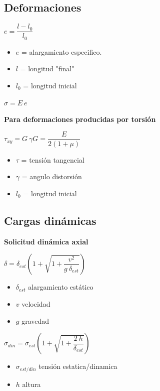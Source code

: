 \documentclass[11pt,a4paper]{article}
\begin{document}
\begin{multicols}{2}
	\begin{cajita}
		\section*{Deformaciones}
		\begin{center}
			$e=\dfrac{l-l_{0}}{l_{0}}$
		\end{center}
		\begin{itemize}[itemsep=-2mm]
			\item $e$ = alargamiento especifico.
			\item $l$ = longitud "final"
			\item $l_{0}$ = longitud inicial
		\end{itemize}
	
		\begin{center}
			$\sigma=E~e$
		\end{center}
	\textbf{	Para deformaciones producidas por torsión}
	\begin{center}
		$\tau_{xy}=G~ \gamma$\hspace*{1.5cm}$G=\dfrac{E}{2(1+\mu)}$
	\end{center}
	\begin{itemize}[itemsep=-2mm]
		\item $\tau$ = tensión tangencial
		\item $\gamma$ = angulo distorsión
		\item $l_{0}$ = longitud inicial
	\end{itemize}
	\end{cajita}

	\begin{cajita}
	\section*{Cargas dinámicas}
	\textbf{Solicitud dinámica axial}\\
	\begin{center}
		$\delta=\delta_{est}\left(1+\sqrt{1+\dfrac{v^{2}}{g~\delta_{est}}}\right)$
	\end{center}
	\begin{itemize}[itemsep=-2mm]
		\item $\delta_{est}$ alargamiento estático
		\item $v$ velocidad
		\item $g$ gravedad
	\end{itemize}
	\begin{center}
	$\sigma_{din}=\sigma_{est}\left(1+\sqrt{1+\dfrac{2~h}{\delta_{est}}}\right)$
	\end{center}
	\begin{itemize}[itemsep=-2mm]
		\item $\sigma_{est/din}$ tensión estatica/dinamica
		\item $h$ altura
	\end{itemize}
	

\end{cajita}
\end{multicols}
\end{document}
